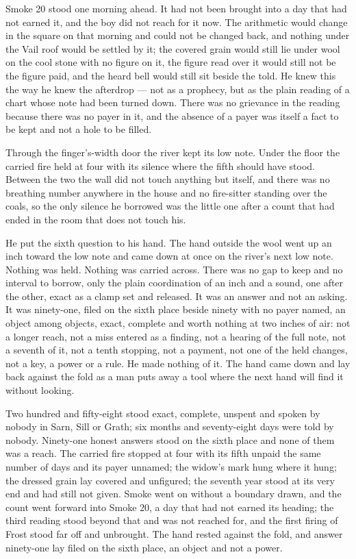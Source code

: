 Smoke 20 stood one morning ahead. It had not been brought into a day that had not earned it, and the boy did not reach for it now. The arithmetic would change in the square on that morning and could not be changed back, and nothing under the Vail roof would be settled by it; the covered grain would still lie under wool on the cool stone with no figure on it, the figure read over it would still not be the figure paid, and the heard bell would still sit beside the told. He knew this the way he knew the afterdrop --- not as a prophecy, but as the plain reading of a chart whose note had been turned down. There was no grievance in the reading because there was no payer in it, and the absence of a payer was itself a fact to be kept and not a hole to be filled.

\scenebreak

Through the finger's-width door the river kept its low note. Under the floor the carried fire held at four with its silence where the fifth should have stood. Between the two the wall did not touch anything but itself, and there was no breathing number anywhere in the house and no fire-sitter standing over the coals, so the only silence he borrowed was the little one after a count that had ended in the room that does not touch his.

He put the sixth question to his hand. The hand outside the wool went up an inch toward the low note and came down at once on the river's next low note. Nothing was held. Nothing was carried across. There was no gap to keep and no interval to borrow, only the plain coordination of an inch and a sound, one after the other, exact as a clamp set and released. It was an answer and not an asking. It was ninety-one, filed on the sixth place beside ninety with no payer named, an object among objects, exact, complete and worth nothing at two inches of air: not a longer reach, not a miss entered as a finding, not a hearing of the full note, not a seventh of it, not a tenth stopping, not a payment, not one of the held changes, not a key, a power or a rule. He made nothing of it. The hand came down and lay back against the fold as a man puts away a tool where the next hand will find it without looking.

Two hundred and fifty-eight stood exact, complete, unspent and spoken by nobody in Sarn, Sill or Grath; six months and seventy-eight days were told by nobody. Ninety-one honest answers stood on the sixth place and none of them was a reach. The carried fire stopped at four with its fifth unpaid the same number of days and its payer unnamed; the widow's mark hung where it hung; the dressed grain lay covered and unfigured; the seventh year stood at its very end and had still not given. Smoke went on without a boundary drawn, and the count went forward into Smoke 20, a day that had not earned its heading; the third reading stood beyond that and was not reached for, and the first firing of Frost stood far off and unbrought. The hand rested against the fold, and answer ninety-one lay filed on the sixth place, an object and not a power.
